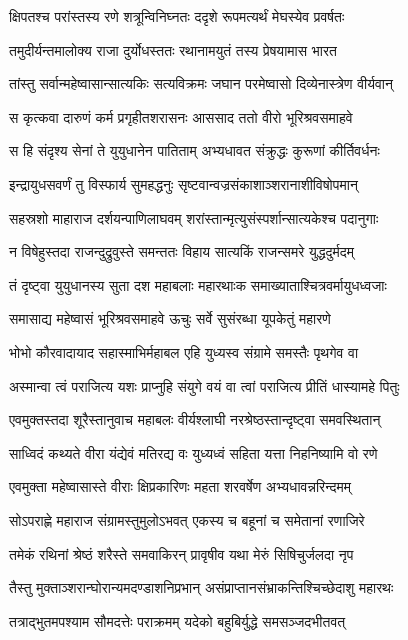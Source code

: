 \twolineshloka
{क्षिपतश्च परांस्तस्य रणे शत्रून्विनिघ्नतः}
{ददृशे रूपमत्यर्थं मेघस्येव प्रवर्षतः}


\twolineshloka
{तमुदीर्यन्तमालोक्य राजा दुर्योधस्ततः}
{रथानामयुतं तस्य प्रेषयामास भारत}


\twolineshloka
{तांस्तु सर्वान्महेष्वासान्सात्यकिः सत्यविक्रमः}
{जघान परमेष्वासो दिव्येनास्त्रेण वीर्यवान्}


\twolineshloka
{स कृत्कवा दारुणं कर्म प्रगृहीतशरासनः}
{आससाद ततो वीरो भूरिश्रवसमाहवे}


\twolineshloka
{स हि संदृश्य सेनां ते युयुधानेन पातिताम्}
{अभ्यधावत संक्रुद्धः कुरूणां कीर्तिवर्धनः}


\twolineshloka
{इन्द्रायुधसवर्णं तु विस्फार्य सुमहद्धनुः}
{सृष्टवान्वज्रसंकाशाञ्शरानाशीविषोपमान्}


\twolineshloka
{सहस्रशो माहाराज दर्शयन्पाणिलाघवम्}
{शरांस्तान्मृत्युसंस्पर्शान्सात्यकेश्च पदानुगाः}


\twolineshloka
{न विषेहुस्तदा राजन्दुद्रुवुस्ते समन्ततः}
{विहाय सात्यकिं राजन्समरे युद्धदुर्मदम्}


\twolineshloka
{तं दृष्ट्वा युयुधानस्य सुता दश महाबलाः}
{महारथाःक समाख्याताश्चित्रवर्मायुधध्वजाः}


\twolineshloka
{समासाद्य महेष्वासं भूरिश्रवसमाहवे}
{ऊचुः सर्वे सुसंरब्धा यूपकेतुं महारणे}


\twolineshloka
{भोभो कौरवादायाद सहास्माभिर्महाबल}
{एहि युध्यस्व संग्रामे समस्तैः पृथगेव वा}


\twolineshloka
{अस्मान्वा त्वं पराजित्य यशः प्राप्नुहि संयुगे}
{वयं वा त्वां पराजित्य प्रीतिं धास्यामहे पितुः}


\twolineshloka
{एवमुक्तस्तदा शूरैस्तानुवाच महाबलः}
{वीर्यश्लाघी नरश्रेष्ठस्तान्दृष्ट्वा समवस्थितान्}


\twolineshloka
{साध्विदं कथ्यते वीरा यंद्येवं मतिरद्य वः}
{युध्यध्वं सहिता यत्ता निहनिष्यामि वो रणे}


\twolineshloka
{एवमुक्ता महेष्वासास्ते वीराः क्षिप्रकारिणः}
{महता शरवर्षेण अभ्यधावन्नरिन्दमम्}


\twolineshloka
{सोऽपराह्णे महाराज संग्रामस्तुमुलोऽभवत्}
{एकस्य च बहूनां च समेतानां रणाजिरे}


\twolineshloka
{तमेकं रथिनां श्रेष्ठं शरैस्ते समवाकिरन्}
{प्रावृषीव यथा मेरुं सिषिचुर्जलदा नृप}


\twolineshloka
{तैस्तु मुक्ताञ्शरान्घोरान्यमदण्डाशनिप्रभान्}
{असंप्राप्तानसंभ्राकन्तिश्चिच्छेदाशु महारथः}


\twolineshloka
{तत्राद्भुतमपश्याम सौमदत्तेः पराक्रमम्}
{यदेको बहुबिर्युद्धे समसञ्जदभीतवत्}


